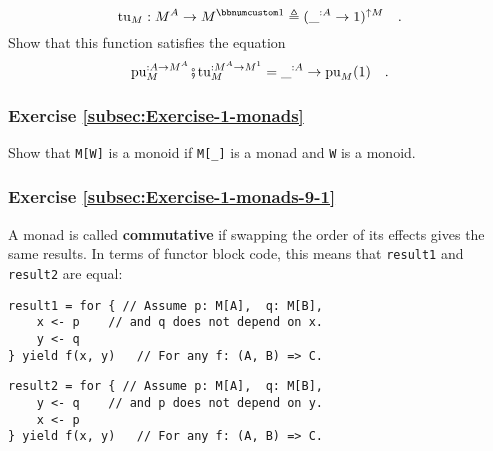 ~\vspace{-0.9\baselineskip}
\[
\text{tu}_{M}:M^{A}\rightarrow M^{\bbnum 1}\triangleq(\_^{:A}\rightarrow1)^{\uparrow M}\quad.
\]
Show that this function satisfies the equation
\[
\text{pu}_{M}^{:A\rightarrow M^{A}}\bef\text{tu}_{M}^{:M^{A}\rightarrow M^{1}}=\_^{:A}\rightarrow\text{pu}_{M}(1)\quad.
\]


\subsubsection{Exercise \label{subsec:Exercise-1-monads}\ref{subsec:Exercise-1-monads}}

Show that \lstinline!M[W]! is a monoid if \lstinline!M[_]! is a
monad and \lstinline!W! is a monoid.

\subsubsection{Exercise \label{subsec:Exercise-1-monads-9-1}\ref{subsec:Exercise-1-monads-9-1}}

A monad is called \textbf{commutative}
if swapping the order of its effects gives the same results. In terms
of functor block code, this means that \lstinline!result1! and \lstinline!result2!
are equal:

\noindent \texttt{\textcolor{blue}{\footnotesize{}}}%
\begin{minipage}[c]{0.475\columnwidth}%
\texttt{\textcolor{blue}{\footnotesize{}}}
\begin{lstlisting}
result1 = for { // Assume p: M[A],  q: M[B],
    x <- p    // and q does not depend on x.
    y <- q
} yield f(x, y)   // For any f: (A, B) => C.
\end{lstlisting}
%
\end{minipage}\texttt{\textcolor{blue}{\footnotesize{}\hspace*{\fill}}}%
\begin{minipage}[c]{0.475\columnwidth}%
\texttt{\textcolor{blue}{\footnotesize{}}}
\begin{lstlisting}
result2 = for { // Assume p: M[A],  q: M[B],
    y <- q    // and p does not depend on y.
    x <- p
} yield f(x, y)   // For any f: (A, B) => C.
\end{lstlisting}
%
\end{minipage}{\footnotesize\par}

\noindent \vspace{0\baselineskip}


